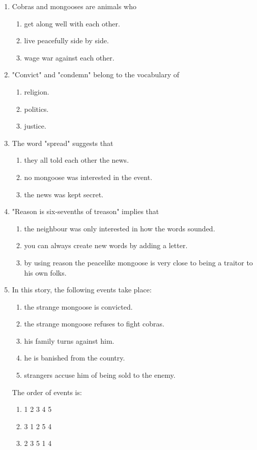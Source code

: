 \documentclass[11pt,a4paper]{article}
\begin{document}
\begin{enumerate}
    \item Cobras and mongooses are animals who
    \begin{enumerate}[label=\alph*.]
        \item get along well with each other.
        \item live peacefully side by side.
        \item wage war against each other.
    \end{enumerate}

    \item "Convict" and "condemn" belong to the vocabulary of
    \begin{enumerate}[label=\alph*.]
        \item religion.
        \item politics.
        \item justice.
    \end{enumerate}

    \item The word "spread" suggests that
    \begin{enumerate}[label=\alph*.]
        \item they all told each other the news.
        \item no mongoose was interested in the event.
        \item the news was kept secret.
    \end{enumerate}

    \item "Reason is six-sevenths of treason" implies that
    \begin{enumerate}[label=\alph*.]
        \item the neighbour was only interested in how the words sounded.
        \item you can always create new words by adding a letter.
        \item by using reason the peacelike mongoose is very close to being a traitor to his own folks.
    \end{enumerate}

    \item In this story, the following events take place:
    \begin{enumerate}[label=\arabic*.]
        \item the strange mongoose is convicted.
        \item the strange mongoose refuses to fight cobras.
        \item his family turns against him.
        \item he is banished from the country.
        \item strangers accuse him of being sold to the enemy.
    \end{enumerate}
    The order of events is:
    \begin{enumerate}[label=\alph*.]
        \item 1 2 3 4 5
        \item 3 1 2 5 4
        \item 2 3 5 1 4
    \end{enumerate}


\end{enumerate}
\end{document}

